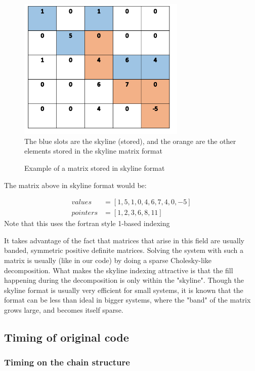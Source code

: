 \documentclass[11pt]{article}
\begin{document}
\begin{figure}[h]
\begin{center}

\caption{Example of a matrix stored in skyline format}
\includegraphics[width=8cm]{skyline}
\label{fig:skyline}
\\
The blue slots are the skyline (stored), and the orange are the other elements stored in the skyline matrix format
\end{center}

\end{figure}
The matrix above in skyline format would be:

\begin{align}
values&=[1,5,1,0,4,6,7,4,0,-5]\\
pointers&= [1,2,3,6,8,11] 
\end{align}
Note that this uses the fortran style 1-based indexing

 It takes advantage of the fact that matrices that arise in this field are usually banded, symmetric positive definite matrices. Solving the system with such a matrix is usually (like in our code) by doing a sparse Cholesky-like decomposition. What makes the skyline indexing attractive is that the fill happening during the decomposition is only within the "skyline".
Though the skyline format is usually very efficient for small systems, it is known that the format can be less than ideal in bigger systems, where the "band" of the matrix grows large, and becomes itself  sparse.

\subsection{Timing of original code}
\subsubsection{Timing on the chain structure}
\end{document}
